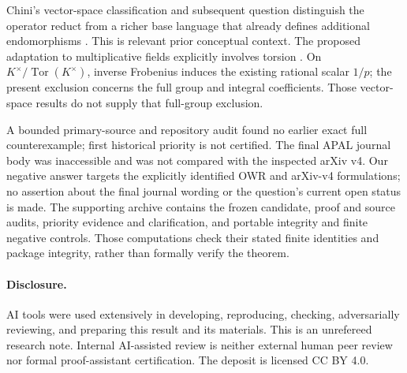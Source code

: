 \documentclass[11pt,a4paper]{article}
\begin{document}
Chini's vector-space classification and subsequent question distinguish
the operator reduct from a richer base language that already defines
additional endomorphisms \cite[Theorem 4.10 and Question 4.11]{chini3}.
This is relevant prior conceptual context. The proposed adaptation to
multiplicative fields explicitly involves torsion
\cite[Remark 2.20]{chini1}. On $K^\times/\operatorname{Tor}(K^\times)$,
inverse Frobenius induces the existing rational scalar $1/p$;
the present exclusion concerns the full group and integral coefficients.
Those vector-space results do not supply that full-group exclusion.

A bounded primary-source and repository audit found no earlier exact
full counterexample; first historical priority is not certified.
The final APAL journal body was inaccessible and was not compared with
the inspected arXiv v4. Our negative answer targets the explicitly
identified OWR and arXiv-v4 formulations; no assertion about the final
journal wording or the question's current open status is made.
The supporting archive contains the frozen candidate, proof and source
audits, priority evidence and clarification, and portable integrity and
finite negative controls. Those computations check their stated finite
identities and package integrity, rather than formally verify the theorem.

\paragraph{Disclosure.}
AI tools were used extensively in developing, reproducing, checking,
adversarially reviewing, and preparing this result and its materials.
This is an unrefereed research note. Internal AI-assisted review is
neither external human peer review nor formal proof-assistant
certification. The deposit is licensed CC BY 4.0.
\end{document}
